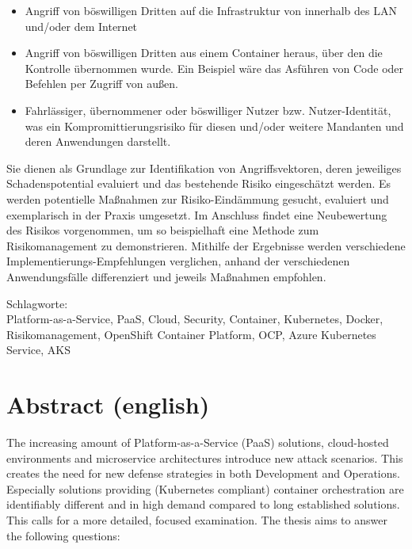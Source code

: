 \begin{itemize}

\item Angriff von böswilligen Dritten auf die Infrastruktur von innerhalb des LAN und/oder dem Internet

\item Angriff von böswilligen Dritten aus einem Container heraus, über den die Kontrolle übernommen wurde. Ein Beispiel wäre das Asführen von Code oder Befehlen per Zugriff von außen.

\item Fahrlässiger, übernommener oder böswilliger Nutzer bzw. Nutzer-Identität, was ein Kompromittierungsrisiko für diesen und/oder weitere Mandanten und deren Anwendungen darstellt.

\end{itemize}

Sie dienen als Grundlage zur Identifikation von Angriffsvektoren, deren jeweiliges Schadenspotential evaluiert und das bestehende Risiko eingeschätzt werden.
Es werden potentielle Maßnahmen zur Risiko-Eindämmung gesucht, evaluiert und exemplarisch in der Praxis umgesetzt.
Im Anschluss findet eine Neubewertung des Risikos vorgenommen, um so beispielhaft eine Methode zum Risikomanagement zu demonstrieren.
Mithilfe der Ergebnisse werden verschiedene Implementierungs-Empfehlungen verglichen, anhand der verschiedenen Anwendungsfälle differenziert und jeweils Maßnahmen empfohlen.

\bigskip

\noindent
Schlagworte: \\
Platform-as-a-Service, PaaS, Cloud, Security, Container, Kubernetes, Docker, Risikomanagement, OpenShift Container Platform, OCP, Azure Kubernetes Service, AKS

\chapter*{Abstract (english)}
\thispagestyle{empty}

The increasing amount of Platform-as-a-Service (PaaS) solutions, cloud-hosted environments and microservice architectures introduce new attack scenarios. 
This creates the need for new defense strategies in both Development and Operations. 
Especially solutions providing (Kubernetes compliant) container orchestration are identifiably different and in high demand compared to long established solutions. 
This calls for a more detailed, focused examination. 
The thesis aims to answer the following questions:

